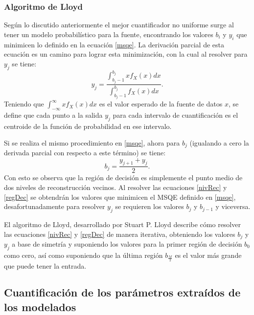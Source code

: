 \subsubsection{Algoritmo de Lloyd}
Según lo discutido anteriormente el mejor cuantificador no uniforme surge al tener un modelo probabilístico para la fuente, encontrando los valores $b_{i}$ y $y_{i}$ que minimicen lo definido en la ecuación \eqref{msqe}. La derivación parcial de esta ecuación es un camino para lograr esta minimización, con la cual al resolver para $y_{j}$ se tiene:
\begin{equation}\label{nivRec}
	y_{j}=\frac{\int_{b_{j}-1}^{b_{j}} xf_{X}(x)dx}{\int_{b_{j}-1}^{b_{j}} f_{X}(x)dx}.
\end{equation}
Teniendo que $\int_{-\infty}^{\infty} xf_{X}(x)dx$ es el valor esperado de la fuente de datos $x$, se define que cada punto a la salida $y_{j}$ para cada intervalo de cuantificación es el centroide de la función de probabilidad en ese intervalo. 

Si se realiza el mismo procedimiento en \eqref{msqe}, ahora para $b_{j}$ (igualando a cero la derivada parcial con respecto a este término) se tiene:
\begin{equation}\label{regDec}
	b_{j} = \frac{y_{j+1}+y_{j}}{2}.
\end{equation}
Con esto se observa que la región de decisión es simplemente el punto medio de dos niveles de reconstrucción vecinos. Al resolver las ecuaciones \eqref{nivRec} y \eqref{regDec} se obtendrán los valores que minimicen el MSQE definido en \eqref{msqe}, desafortunadamente para resolver $y_{j}$ se requieren los valores $b_{j}$ y $b_{j-1}$ y viceversa. 

El algoritmo de Lloyd, desarrollado por Stuart P. Lloyd describe cómo resolver las ecuaciones \eqref{nivRec} y \eqref{regDec} de manera iterativa, obteniendo los valores $b_{j}$ y $y_{j}$ a base de simetría y suponiendo los valores para la primer región de decisión $b_{0}$ como cero, así como suponiendo que la última región $b_{\frac{M}{2}}$ es el valor más grande que puede tener la entrada. 

\subsection{Cuantificación de los parámetros extraídos de los modelados}

